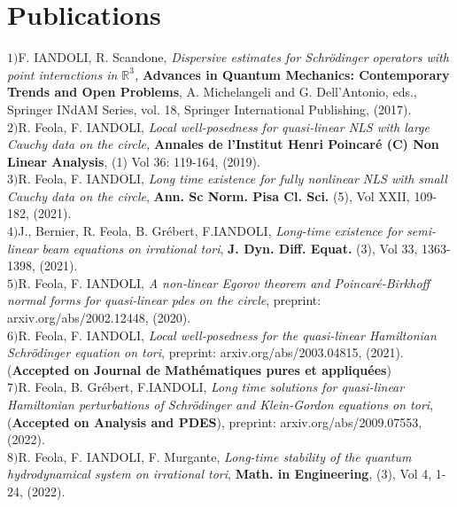 \documentclass[margin,line,pifont,palatino,courier]{res}
\begin{document}
\section{Publications}
$1) ${\rm{F. IANDOLI, R. Scandone}},  \textit{Dispersive estimates for Schr\"odinger operators with point interactions in $\mathbb{R}^3$,}  {\textbf {Advances in Quantum Mechanics: Contemporary Trends and Open Problems}}, A. Michelangeli and G. Dell'Antonio, eds., Springer INdAM Series, vol. 18, Springer International Publishing, (2017).\vspace{0.1cm}\\
$2) ${\rm{R. Feola, F. IANDOLI}},  \textit{Local well-posedness for quasi-linear NLS with large Cauchy data on the circle,}  \textbf{Annales de l'Institut Henri Poincar\'e (C) Non Linear Analysis}, (1) Vol 36: 119-164, (2019).\vspace{0.1cm}\\
$3) ${\rm{R. Feola, F. IANDOLI}}, \textit{Long time existence for fully nonlinear NLS with small Cauchy data on the circle},   \textbf{Ann. Sc Norm.  Pisa Cl. Sci.} (5), Vol XXII, 109-182, (2021).\vspace{0.1cm}\\
$4) ${\rm{J., Bernier, R. Feola, B. Gr\'ebert, F.IANDOLI}}, \textit{Long-time existence for semi-linear beam equations on irrational tori},  \textbf{J. Dyn. Diff. Equat.} (3), Vol 33, 1363-1398, (2021). \vspace{0.1cm}\\
$5) ${\rm{R. Feola, F. IANDOLI}}, \textit{A non-linear Egorov theorem and Poincar\'e-Birkhoff normal forms for quasi-linear pdes on the circle}, preprint: arxiv.org/abs/2002.12448, (2020).\vspace{0.1cm}\\
$6) ${\rm{R. Feola, F. IANDOLI}}, \textit{Local well-posedness for the quasi-linear Hamiltonian Schr\"odinger equation on tori}, preprint: arxiv.org/abs/2003.04815, (2021). (\textbf{Accepted on Journal de Math\'ematiques pures et appliqu\'ees})\vspace{0.1cm}\\
$7) ${\rm{R. Feola, B. Gr\'ebert, F.IANDOLI}}, \textit{Long time solutions for quasi-linear Hamiltonian perturbations of Schr\"odinger and Klein-Gordon equations on tori}, (\textbf{Accepted on Analysis and PDES}), preprint: arxiv.org/abs/2009.07553, (2022). \vspace{0.1cm}\\
$8) ${\rm{R. Feola, F. IANDOLI, F. Murgante}}, \textit{Long-time stability of the quantum hydrodynamical system on irrational tori}, \textbf{Math. in Engineering}, (3), Vol 4, 1-24, (2022).\vspace{0.1cm}\\
\end{document}
